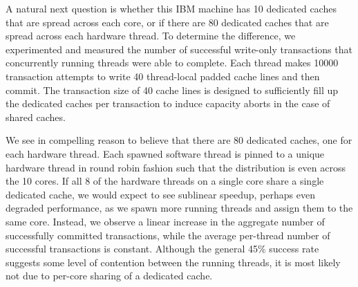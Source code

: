 A natural next question is whether this IBM machine has 10 dedicated caches that
are spread across each core, or if there are 80 dedicated caches that are spread
across each hardware thread. To determine the difference, we experimented and
measured the number of successful write-only transactions that concurrently
running threads were able to complete. Each thread makes 10000 transaction
attempts to write 40 thread-local padded cache lines and then commit. The
transaction size of 40 cache lines is designed to sufficiently fill up the
dedicated caches per transaction to induce capacity aborts in the case of shared
caches.

We see in  compelling reason to believe that
there are 80 dedicated caches, one for each hardware thread. Each spawned
software thread is pinned to a unique hardware thread in round robin fashion
such that the distribution is even across the 10 cores. If all 8 of the
hardware threads on a single core share a single dedicated cache, we would
expect to see sublinear speedup, perhaps even degraded performance, as we spawn
more running threads and assign them to the same core. Instead, we observe a
linear increase in the aggregate number of successfully committed transactions,
while the average per-thread number of successful transactions is constant.
Although the general 45\% success rate suggests some level of contention between
the running threads, it is most likely not due to per-core sharing of a
dedicated cache.
 
